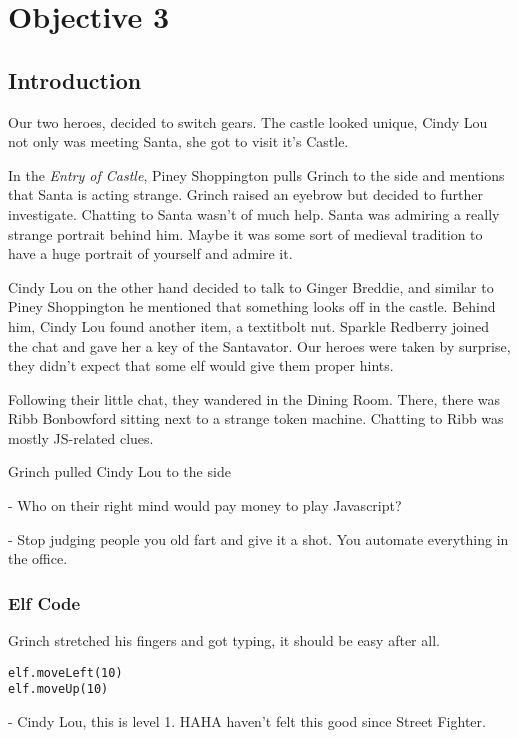 \chapter{Objective 3}

\section{Introduction}

Our two heroes, decided to switch gears. The castle looked unique, Cindy Lou not only was meeting Santa, she got to visit it's Castle.

In the \textit{Entry of Castle}, {\color{codegreen}Piney Shoppington} pulls Grinch to the side and mentions that Santa is acting strange.
Grinch raised an eyebrow but decided to further investigate. Chatting to Santa wasn't of much help. Santa was admiring
a really strange portrait behind him. Maybe it was some sort of medieval tradition to have a huge portrait of yourself and admire it.

Cindy Lou on the other hand decided to talk to {\color{codegreen}Ginger Breddie}, and similar to {\color{codegreen}Piney Shoppington} he mentioned that something looks off in the castle.
Behind him, Cindy Lou found another item, a textit{bolt nut}. {\color{codegreen}Sparkle Redberry} joined the chat and gave her a key of the Santavator. Our heroes were taken by surprise, they didn't expect that some elf would give them proper hints.

Following their little chat, they wandered in the Dining Room. There, there was {\color{codegreen}Ribb Bonbowford} sitting next to a strange token machine. Chatting to {\color{codegreen}Ribb} was mostly JS-related clues.

Grinch pulled Cindy Lou to the side

- Who on their right mind would pay money to play Javascript?

- Stop judging people you old fart and give it a shot. You automate everything in the office.

\subsection{Elf Code}
Grinch stretched his fingers and got typing, it should be easy after all.
\begin{verbatim}
elf.moveLeft(10)
elf.moveUp(10)
\end{verbatim}

- Cindy Lou, this is level 1. HAHA haven't felt this good since Street Fighter.


